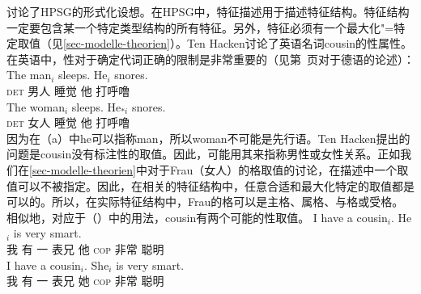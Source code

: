 \mbox{}讨论了HPSG\indexhpsgc 的形式化设想。在HPSG中，特征描述用于描述特征结构。特征结构一定要包含某一个特定类型结构的所有特征。另外，特征必须有一个最大化"=特定取值（见\ref{sec-modelle-theorien}）。Ten Hacken讨论了英语名词cousin的性属性。在英语中，性对于确定代词正确的限制是非常重要的（见第~\pageref{le-buch}页对于德语的论述）：
\eal
\ex 
\gll The man$_i$ sleeps. He$_i$ snores.\\
	 \textsc{det} 男人 睡觉 他  打呼噜\\
\ex 
\gll The woman$_i$ sleeps. He$_{*i}$ snores.\\
	 \textsc{det} 女人 睡觉 他  打呼噜\\
\zl
因为在（a）中he可以指称man，所以woman不可能是先行语。Ten Hacken提出的问题是cousin没有标注性的取值。因此，可能用其来指称男性或女性关系。正如我们在\ref{sec-modelle-theorien}中对于Frau（女人）的格取值的讨论，在描述中一个取值可以不被指定。因此，在相关的特征结构中，任意合适和最大化特定的取值都是可以的。所以，在实际特征结构中，Frau的格可以是主格、属格、与格或受格。相似地，对应于（）中的用法，cousin有两个可能的性取值。
\eal
\ex 
\gll I have a cousin$_i$. He$_i$ is very smart.\\
	 我 有 一 表兄 他 \textsc{cop} 非常 聪明\\
\ex 
\gll I have a cousin$_i$. She$_i$ is very smart.\\
	 我 有 一 表兄 她 \textsc{cop} 非常 聪明\\
\zl

